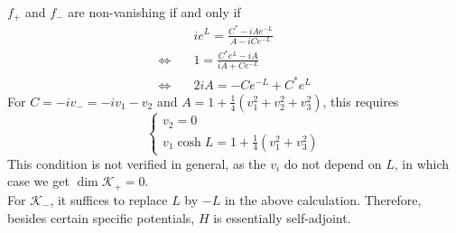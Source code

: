 $f_+$ and $f_-$ are non-vanishing if and only if 
\begin{equation}
\begin{split}
& ie^L = \frac{C^* - iA e^{-L}}{A - iC e^{-L}} \\
\Leftrightarrow \quad & 1 = \frac{C^* e^L - iA}{iA + C e^{-L}} \\
\Leftrightarrow \quad & 2i A = -C e^{-L} + C^*e^L
\end{split}
\end{equation}
For $C = -iv_- = -iv_1 - v_2$ and $A = 1 + \frac{1}{4}(v_1^2 + v_2^2 + v_3^2)$, this requires
\begin{equation}
\begin{cases}
v_2 = 0 \\
v_1 \cosh L = 1 + \frac{1}{4}(v_1^2 + v_3^2)
\end{cases}
\end{equation}
This condition is not verified in general, as the $v_i$ do not depend on $L$, in which case we get $\dim \mathcal{K}_+ = 0$. \\
For $\mathcal{K}_-$, it suffices to replace $L$ by $-L$ in the above calculation. Therefore, besides certain specific potentials, $H$ is essentially self-adjoint.

















